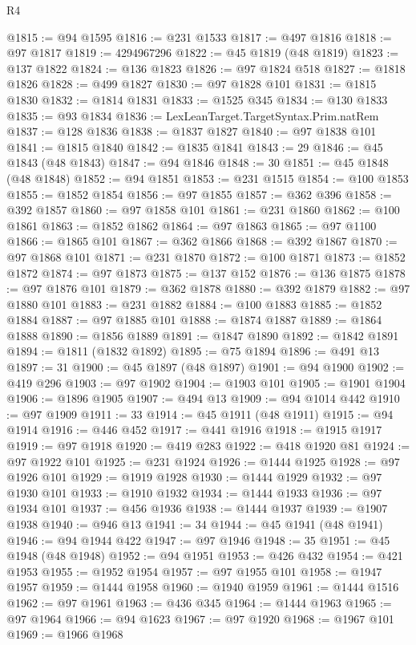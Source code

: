 \begin{lexlean}{R4}
\begin{coremodule}
@1815 := @94 @1595
@1816 := @231 @1533
@1817 := @497 @1816
@1818 := @97 @1817
@1819 := 4294967296
@1822 := @45 @1819 (@48 @1819)
@1823 := @137 @1822
@1824 := @136 @1823
@1826 := @97 @1824 @518
@1827 := @1818 @1826
@1828 := @499 @1827
@1830 := @97 @1828 @101
@1831 := @1815 @1830
@1832 := @1814 @1831
@1833 := @1525 @345
@1834 := @130 @1833
@1835 := @93 @1834
@1836 := LexLeanTarget.TargetSyntax.Prim.natRem
@1837 := @128 @1836
@1838 := @1837 @1827
@1840 := @97 @1838 @101
@1841 := @1815 @1840
@1842 := @1835 @1841
@1843 := 29
@1846 := @45 @1843 (@48 @1843)
@1847 := @94 @1846
@1848 := 30
@1851 := @45 @1848 (@48 @1848)
@1852 := @94 @1851
@1853 := @231 @1515
@1854 := @100 @1853
@1855 := @1852 @1854
@1856 := @97 @1855
@1857 := @362 @396
@1858 := @392 @1857
@1860 := @97 @1858 @101
@1861 := @231 @1860
@1862 := @100 @1861
@1863 := @1852 @1862
@1864 := @97 @1863
@1865 := @97 @1100
@1866 := @1865 @101
@1867 := @362 @1866
@1868 := @392 @1867
@1870 := @97 @1868 @101
@1871 := @231 @1870
@1872 := @100 @1871
@1873 := @1852 @1872
@1874 := @97 @1873
@1875 := @137 @152
@1876 := @136 @1875
@1878 := @97 @1876 @101
@1879 := @362 @1878
@1880 := @392 @1879
@1882 := @97 @1880 @101
@1883 := @231 @1882
@1884 := @100 @1883
@1885 := @1852 @1884
@1887 := @97 @1885 @101
@1888 := @1874 @1887
@1889 := @1864 @1888
@1890 := @1856 @1889
@1891 := @1847 @1890
@1892 := @1842 @1891
@1894 := @1811 (@1832 @1892)
@1895 := @75 @1894
@1896 := @491 @13
@1897 := 31
@1900 := @45 @1897 (@48 @1897)
@1901 := @94 @1900
@1902 := @419 @296
@1903 := @97 @1902
@1904 := @1903 @101
@1905 := @1901 @1904
@1906 := @1896 @1905
@1907 := @494 @13
@1909 := @94 @1014 @442
@1910 := @97 @1909
@1911 := 33
@1914 := @45 @1911 (@48 @1911)
@1915 := @94 @1914
@1916 := @446 @452
@1917 := @441 @1916
@1918 := @1915 @1917
@1919 := @97 @1918
@1920 := @419 @283
@1922 := @418 @1920 @81
@1924 := @97 @1922 @101
@1925 := @231 @1924
@1926 := @1444 @1925
@1928 := @97 @1926 @101
@1929 := @1919 @1928
@1930 := @1444 @1929
@1932 := @97 @1930 @101
@1933 := @1910 @1932
@1934 := @1444 @1933
@1936 := @97 @1934 @101
@1937 := @456 @1936
@1938 := @1444 @1937
@1939 := @1907 @1938
@1940 := @946 @13
@1941 := 34
@1944 := @45 @1941 (@48 @1941)
@1946 := @94 @1944 @422
@1947 := @97 @1946
@1948 := 35
@1951 := @45 @1948 (@48 @1948)
@1952 := @94 @1951
@1953 := @426 @432
@1954 := @421 @1953
@1955 := @1952 @1954
@1957 := @97 @1955 @101
@1958 := @1947 @1957
@1959 := @1444 @1958
@1960 := @1940 @1959
@1961 := @1444 @1516
@1962 := @97 @1961
@1963 := @436 @345
@1964 := @1444 @1963
@1965 := @97 @1964
@1966 := @94 @1623
@1967 := @97 @1920
@1968 := @1967 @101
@1969 := @1966 @1968

\end{coremodule}
\end{lexlean}
